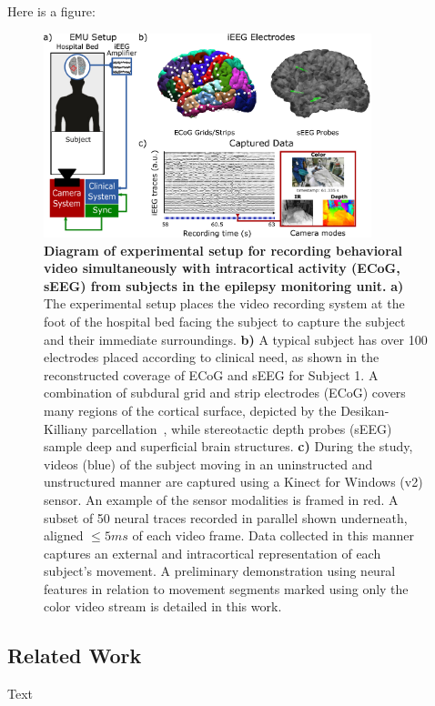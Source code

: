 Here is a figure:
\begin{figure}[!ht]
\centering
\includegraphics[width=0.85\textwidth]{img/method_setup.pdf}
\caption[This is the short form of the caption. It has to be no more than 4 lines.]{\textbf{Diagram of experimental setup for recording behavioral video simultaneously with intracortical activity (ECoG, sEEG) from subjects in the epilepsy monitoring unit.} \textbf{a)} The experimental setup places the video recording system at the foot of the hospital bed facing the subject to capture the subject and their immediate surroundings. \textbf{b)} A typical subject has over 100 electrodes placed according to clinical need, as shown in the reconstructed coverage of ECoG and sEEG for Subject 1. A combination of subdural grid and strip electrodes (ECoG) covers many regions of the cortical surface, depicted by the Desikan-Killiany parcellation~\cite{desikan2006automated}, while stereotactic depth probes (sEEG) sample deep and superficial brain structures. \textbf{c)} During the study, videos (blue) of the subject moving in an uninstructed and unstructured manner are captured using a Kinect for Windows (v2) sensor. An example of the sensor modalities is framed in red. A subset of 50 neural traces recorded in parallel shown underneath, aligned $\leq 5ms$ of each video frame. Data collected in this manner captures an external and intracortical representation of each subject's movement. A preliminary demonstration using neural features in relation to movement segments marked using only the color video stream is detailed in this work.}
\label{fig-setup}
\end{figure}

\subsection{Related Work} \label{comm-ssec:previous_work}
Text

